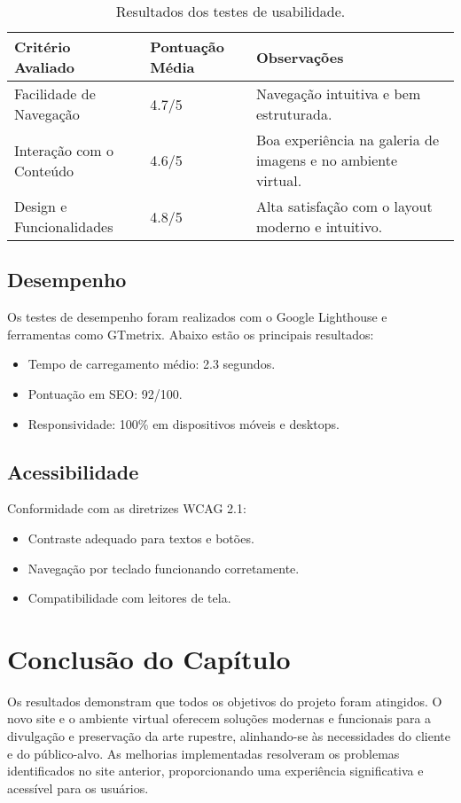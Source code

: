 \begin{table}[H]
\centering
\caption{Resultados dos testes de usabilidade.}
\label{tab:usabilidade}
\begin{tabularx}{\textwidth}{|l|X|X|} %
\hline
\textbf{Critério Avaliado} & \textbf{Pontuação Média} & \textbf{Observações} \\ \hline
Facilidade de Navegação    & 4.7/5                   & Navegação intuitiva e bem estruturada. \\ \hline
Interação com o Conteúdo    & 4.6/5                   & Boa experiência na galeria de imagens e no ambiente virtual. \\ \hline
Design e Funcionalidades    & 4.8/5                   & Alta satisfação com o layout moderno e intuitivo. \\ \hline
\end{tabularx}
\end{table}

\subsection{Desempenho}
Os testes de desempenho foram realizados com o Google Lighthouse e ferramentas como GTmetrix. Abaixo estão os principais resultados:
\begin{itemize}
    \item Tempo de carregamento médio: 2.3 segundos.
    \item Pontuação em SEO: 92/100.
    \item Responsividade: 100\% em dispositivos móveis e desktops.
\end{itemize}

\subsection{Acessibilidade}
Conformidade com as diretrizes WCAG 2.1:
\begin{itemize}
    \item Contraste adequado para textos e botões.
    \item Navegação por teclado funcionando corretamente.
    \item Compatibilidade com leitores de tela.
\end{itemize}


\section{Conclusão do Capítulo}
Os resultados demonstram que todos os objetivos do projeto foram atingidos. O novo site e o ambiente virtual oferecem soluções modernas e funcionais para a divulgação e preservação da arte rupestre, alinhando-se às necessidades do cliente e do público-alvo. As melhorias implementadas resolveram os problemas identificados no site anterior, proporcionando uma experiência significativa e acessível para os usuários.

